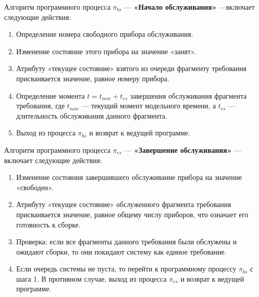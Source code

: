\documentclass[bachelor, och, pract, times]{SCWorks}
\begin{document}
Алгоритм программного процесса $\pi_{bs}$ — \textbf{«Начало обслуживания»} —включает следующие действия:
    \begin{enumerate}
        \item Определение номера свободного прибора обслуживания.
        \item Изменение состояние этого прибора на значение «занят».
        \item Атрибуту «текущее состояние» взятого из очереди фрагменту требования присваивается значение, равное номеру прибора.
        \item  Определение момента $t = t_{now} + t_{es}$ завершения обслуживания фрагмента требования, где $t_{now}$ — текущий момент модельного времени, а $t_{es}$ — длительность обслуживания данного фрагмента.
        \item Выход из процесса $\pi_{bs}$ и возврат к ведущей программе.
\end{enumerate}

Алгоритм программного процесса $\pi_{es}$ — \textbf{«Завершение обслуживания»} — включает следующие действия:
    \begin{enumerate}
        \item Изменение состояния завершившего обслуживание прибора на значение «свободен».
        \item Атрибуту «текущее состояние» обслуженного фрагмента требования присваивается значение, равное общему числу приборов, что означает его готовность к сборке.
        \item Проверка: если все фрагменты данного требования были обслужены и ожидают сборки, то они покидают систему как единое требование.
        \item Если очередь системы не пуста, то перейти к программному процессу $\pi_{bs}$ с шага 1. В противном случае, выход из процесса $\pi_{es}$ и возврат к ведущей программе.
\end{enumerate}
\end{document}
